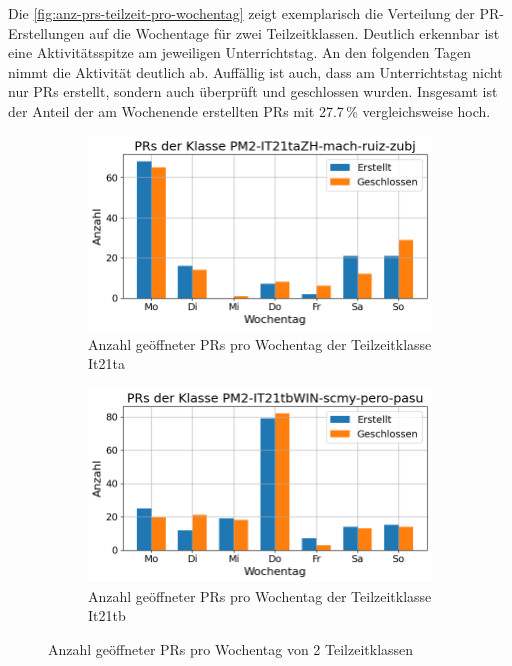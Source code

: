 Die \autoref{fig:anz-prs-teilzeit-pro-wochentag} zeigt exemplarisch die Verteilung der PR-Erstellungen auf die Wochentage für zwei Teilzeitklassen. Deutlich erkennbar ist eine Aktivitätsspitze am jeweiligen Unterrichtstag. An den folgenden Tagen nimmt die Aktivität deutlich ab. Auffällig ist auch, dass am Unterrichtstag nicht nur PRs erstellt, sondern auch überprüft und geschlossen wurden. Insgesamt ist der Anteil der am Wochenende erstellten PRs mit 27.7\,\% vergleichsweise hoch.

\begin{figure}[htbp]
    \centering
    \begin{subfigure}[b]{0.48\textwidth}
        \centering
        \includegraphics[width=\textwidth]{Figures/pr-klasse-per-wochentag-it21ta.png}
         \caption{Anzahl geöffneter PRs pro Wochentag der Teilzeitklasse It21ta}
        \label{fig:anzahl-prs-pro-wochentag-it21ta}
    \end{subfigure}
    \hfill
    \begin{subfigure}[b]{0.48\textwidth}
        \centering
        \includegraphics[width=\textwidth]{Figures/pr-klasse-per-wochentag-21tb.png}
         \caption{Anzahl geöffneter PRs pro Wochentag der Teilzeitklasse It21tb}
        \label{fig:anzahl-prs-pro-wochentag-it21tb}
    \end{subfigure}
    \caption{Anzahl geöffneter PRs pro Wochentag von 2 Teilzeitklassen}
    \label{fig:anz-prs-teilzeit-pro-wochentag}
\end{figure}

